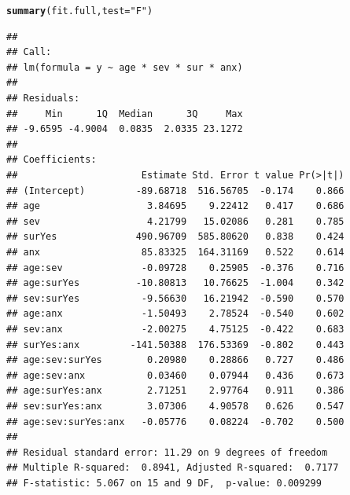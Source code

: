\documentclass{article}\usepackage[]{graphicx}\usepackage[]{color}
\makeatletter
\newcommand{\hlstr}[1]{\textcolor[rgb]{0.192,0.494,0.8}{#1}}%
\newcommand{\hlstd}[1]{\textcolor[rgb]{0.345,0.345,0.345}{#1}}%
\newcommand{\hlkwc}[1]{\textcolor[rgb]{0.333,0.667,0.333}{#1}}%
\newcommand{\hlkwd}[1]{\textcolor[rgb]{0.737,0.353,0.396}{\textbf{#1}}}%
\newenvironment{kframe}{%
 \def\at@end@of@kframe{}%
 \ifinner\ifhmode%
  \def\at@end@of@kframe{\end{minipage}}%
  \begin{minipage}{\columnwidth}%
 \fi\fi%
 \def\FrameCommand##1{\hskip\@totalleftmargin \hskip-\fboxsep
 \colorbox{shadecolor}{##1}\hskip-\fboxsep
     \hskip-\linewidth \hskip-\@totalleftmargin \hskip\columnwidth}%
 \MakeFramed {\advance\hsize-\width
   \@totalleftmargin\z@ \linewidth\hsize
   \@setminipage}}%
 {\par\unskip\endMakeFramed%
 \at@end@of@kframe}
\newenvironment{knitrout}{}{} %
\makeatother
\begin{document}
\clearpage
\begin{knitrout}
\color{fgcolor}\begin{kframe}
\begin{alltt}
\hlkwd{summary}\hlstd{(fit.full,}\hlkwc{test} \hlstd{=} \hlstr{"F"}\hlstd{)}
\end{alltt}
\begin{verbatim}
## 
## Call:
## lm(formula = y ~ age * sev * sur * anx)
## 
## Residuals:
##     Min      1Q  Median      3Q     Max 
## -9.6595 -4.9004  0.0835  2.0335 23.1272 
## 
## Coefficients:
##                      Estimate Std. Error t value Pr(>|t|)
## (Intercept)         -89.68718  516.56705  -0.174    0.866
## age                   3.84695    9.22412   0.417    0.686
## sev                   4.21799   15.02086   0.281    0.785
## surYes              490.96709  585.80620   0.838    0.424
## anx                  85.83325  164.31169   0.522    0.614
## age:sev              -0.09728    0.25905  -0.376    0.716
## age:surYes          -10.80813   10.76625  -1.004    0.342
## sev:surYes           -9.56630   16.21942  -0.590    0.570
## age:anx              -1.50493    2.78524  -0.540    0.602
## sev:anx              -2.00275    4.75125  -0.422    0.683
## surYes:anx         -141.50388  176.53369  -0.802    0.443
## age:sev:surYes        0.20980    0.28866   0.727    0.486
## age:sev:anx           0.03460    0.07944   0.436    0.673
## age:surYes:anx        2.71251    2.97764   0.911    0.386
## sev:surYes:anx        3.07306    4.90578   0.626    0.547
## age:sev:surYes:anx   -0.05776    0.08224  -0.702    0.500
## 
## Residual standard error: 11.29 on 9 degrees of freedom
## Multiple R-squared:  0.8941,	Adjusted R-squared:  0.7177 
## F-statistic: 5.067 on 15 and 9 DF,  p-value: 0.009299
\end{verbatim}
\end{kframe}
\end{knitrout}
\clearpage
\end{document}
